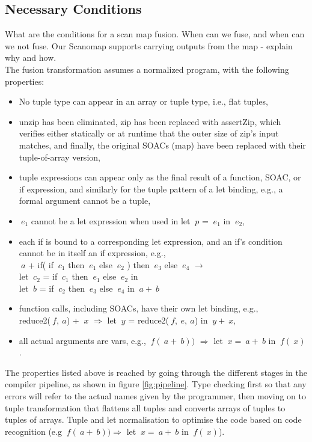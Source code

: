 \documentclass[11pt]{article}
\begin{document}
\subsection{Necessary Conditions}
What are the conditions for a scan map fusion. When can we fuse, and when can we not fuse.
Our Scanomap supports carrying outputs from the map - explain why and how. \\

The fusion transformation assumes a normalized program, with the following properties: \cite[Figure 5, page 4]{T2Fusion} 

\begin{itemize}
\item No tuple type can appear in an array or tuple type, i.e., flat
tuples,
\item unzip has been eliminated, zip has been replaced with assertZip,
which verifies either statically or at runtime that the outer size of zip’s input matches, and finally, the original SOACs (map)
have been replaced with their tuple-of-array version,
\item tuple expressions can appear only as the final result of a function,
SOAC, or if expression, and similarly for the tuple pattern
of a let binding, e.g., a formal argument cannot be a tuple,
\item $\: e_1$ cannot be a let expression when used in let $\: p$ = $\: e_1$ in $\: e_2$,
\item each if is bound to a corresponding let expression, and
an if’s condition cannot be in itself an if expression, e.g., \\
$\: a$ + if( if $\: c_1$ then $\: e_1$ else $\: e_2$ ) then $\: e_3$ else $\: e_4$ $\rightarrow$ \\
let $\: c_2$ = if $\: c_1$ then $\: e_1$ else $\: e_2$ in \\
let $\: b$ = if $\: c_2$ then $\: e_3$ else $\: e_4$ in $\: a+ \:b$ 
\item function calls, including SOACs, have their own let binding, e.g., \\
reduce2($\:f,\:a$) + $\:x$ $\Rightarrow$ let $\:y$ = reduce2($\:f,\:e,\:a$) in $\:y+\:x$,
\item all actual arguments are vars, e.g., $\:f(\:a+\:b))$ $\Rightarrow$ let $\:x=\:a+\:b$ in $\:f(\:x)$.
\end{itemize}
The properties listed above is reached by going through the different stages in the compiler pipeline, as shown in figure \ref{fig:pipeline}. Type checking first so that any errors will refer to the actual names given by the programmer, then moving on to tuple transformation that flattens all tuples and converts arrays of tuples to tuples of arrays. Tuple and let normalisation to optimise the code based on code recognition (e.g $\:f(\:a+\:b)) \Rightarrow$ let $\:x=\:a+\:b$ in $\:f(\:x)$).
\end{document}
